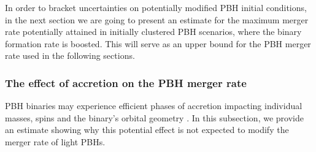 \documentclass[11pt,a4paper]{article}
\begin{document}
In order to bracket uncertainties on potentially modified PBH initial conditions, 
in the next section we are going to present an estimate for the maximum merger rate potentially attained in initially clustered PBH scenarios, where the binary formation rate is boosted. 
This will serve as an upper bound for the PBH merger rate used in the following sections. 


\subsubsection{The effect of accretion on the PBH merger rate}
PBH binaries may experience efficient phases of accretion impacting individual masses, spins and the binary's orbital geometry \cite{DeLuca:2020bjf,DeLuca:2020fpg,DeLuca:2020qqa}. 
In this subsection, we provide an estimate showing why this potential effect is not expected to modify the merger rate of light PBHs. 
\end{document}
